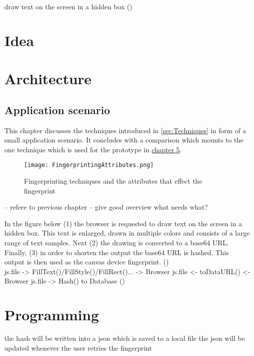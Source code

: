  draw text on the screen in a hidden box
(\textcite{jkula17})\\


\section{Idea}

\section{Architecture}

\subsection{Application scenario}

This chapter discusses the techniques introduced in \autoref{sec:Techniques} in form of a small application scenario. It concludes with a comparison which mounts to the one technique which is used for the prototype in \hyperref[cha:implementation]{chapter 5}.

\begin{figure}[H]
	\centering
	\texttt{[image: FingerprintingAttributes.png]}
	\caption{Fingerprinting techniques and the attributes that effect the fingerprint}
	\label{BrowserSpecification}
\end{figure}

-- refere to previous chapter
-- give good overview what needs what?

In the figure below (1) the browser is requested to draw text on the screen in a hidden box. This text is enlarged, drawn in multiple colors and consists of a large range of text samples. Next (2) the drawing is converted to a base64 URL. Finally, (3) in order to shorten the output the base64 URL is hashed. This output is then used as the canvas device fingerprint. 
(\textcite{jkula17})\\

js.file -> FillText()/FillStyle()/FillRect()... -> Browser
js.file <- toDataURL() <- Browser
js.file -> Hash() to Database
(\textcite{jkula17})

\section{Programming}

the hash will be written into a json which is saved to a local file
the json will be updated whenever the user retries the fingerprint

